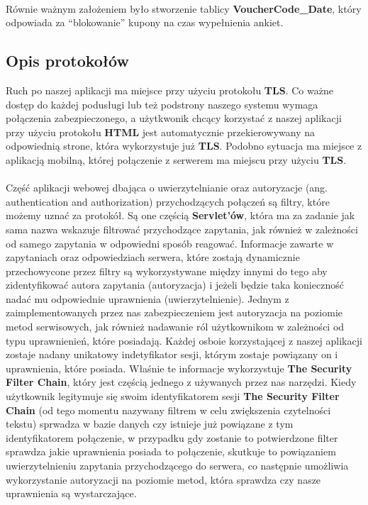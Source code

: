 \paragraph{}
Równie ważnym założeniem było stworzenie tablicy \textbf{VoucherCode\_Date}, który odpowiada za ``blokowanie'' kupony na czas wypełnienia ankiet.
\subsection{Opis protokołów}
Ruch po naszej aplikacji ma miejsce przy użyciu protokołu \textbf{TLS}. Co ważne dostęp do każdej podusługi lub też podstrony naszego systemu wymaga połączenia zabezpieczonego, a użytkwonik chcący korzystać z naszej aplikacji przy użyciu protokołu \textbf{HTML} jest automatycznie przekierowywany na odpowiednią strone, która wykorzystuje już \textbf{TLS}. Podobno sytuacja ma miejsce z aplikacją mobilną, której połączenie z serwerem ma miejscu przy użyciu \textbf{TLS}.

\paragraph{}
Część aplikacji webowej dbająca o uwierzytelnianie	oraz autoryzacje (ang. authentication and authorization) przychodzących połączeń są filtry, które możemy uznać za protokół. Są one częścią \textbf{Servlet'ów}, która ma za zadanie jak sama nazwa wskazuje filtrować przychodzące zapytania, jak również w zależności od samego zapytania w odpowiedni sposób reagować. Informacje zawarte w zapytaniach oraz odpowiedziach serwera, które zostają dynamicznie przechowycone przez filtry są wykorzystywane między innymi do tego aby zidentyfikować autora zapytania (autoryzacja) i jeżeli będzie taka konieczność nadać mu odpowiednie uprawnienia (uwierzytelnienie). Jednym z zaimplementowanych przez nas zabezpieczeniem jest autoryzacja na poziomie metod serwisowych, jak również nadawanie ról użytkownikom w zależności od typu uprawnienień, które posiadają. Każdej osboie korzystającej z naszej aplikacji zostaje nadany unikatowy indetyfikator sesji, którym zostaje powiązany on i uprawnienia, które posiada. Właśnie te informacje wykorzystuje \textbf{The Security Filter Chain}, który jest częścią jednego z używanych przez nas narzędzi. Kiedy użytkownik legitymuje się swoim identyfikatorem sesji \textbf{The Security Filter Chain} (od tego momentu nazywany filtrem w celu zwiększenia czytelności tekstu) sprwadza w bazie danych czy istnieje już powiązane z tym identyfikatorem połączenie, w przypadku gdy zostanie to potwierdzone filter sprawdza jakie uprawnienia posiada to połączenie, skutkuje to powiązaniem uwierzytelnieniu zapytania przychodzącego do serwera, co następnie umożliwia wykorzystanie autoryzacji na poziomie metod, która sprawdza czy nasze uprawnienia są wystarczające.

